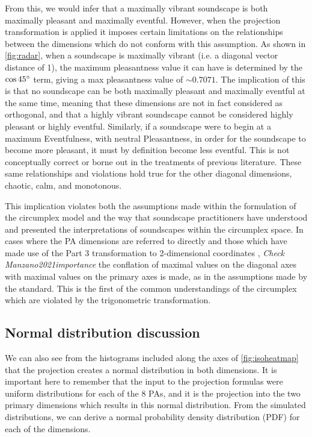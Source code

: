 From this, we would infer that a maximally vibrant soundscape is both maximally pleasant and maximally eventful. However, when the projection transformation is applied it imposes certain limitations on the relationships between the dimensions which do not conform with this assumption. As shown in \cref{fig:radar}, when a soundscape is maximally vibrant (i.e. a diagonal vector distance of 1), the maximum pleasantness value it can have is determined by the $\cos 45\degree$ term, giving a max pleasantness value of $\sim0.7071$. The implication of this is that no soundscape can be both maximally pleasant and maximally eventful at the same time, meaning that these dimensions are not in fact considered as orthogonal, and that a highly vibrant soundscape cannot be considered highly pleasant or highly eventful. Similarly, if a soundscape were to begin at a maximum Eventfulness, with neutral Pleasantness, in order for the soundscape to become more pleasant, it must by definition become less eventful. This is not conceptually correct or borne out in the treatments of previous literature. These same relationships and violations hold true for the other diagonal dimensions, chaotic, calm, and monotonous.

This implication violates both the assumptions made within the formulation of the circumplex model and the way that soundscape practitioners have understood and presented the interpretations of soundscapes within the circumplex space. In cases where the PA dimensions are referred to directly \citep{steele2016evaluation, steele2019soundtracking} and those which have made use of the Part 3 transformation to 2-dimensional coordinates \citep{Mancini2021Soundwalk, Lionello2021Introducing, Manzano2021importance}, \emph{Check Manzano2021importance} the conflation of maximal values on the diagonal axes with maximal values on the primary axes is made, as in the assumptions made by the standard. This is the first of the common understandings of the circumplex which are violated by the trigonometric transformation.

\subsection{Normal distribution discussion}

We can also see from the histograms included along the axes of \cref{fig:isoheatmap} that the projection creates a normal distribution in both dimensions. %
It is important here to remember that the input to the projection formulas were uniform distributions for each of the 8 PAs, and it is the projection into the two primary dimensions which results in this normal distribution.
From the simulated distributions, we can derive a normal probability density distribution (PDF) for each of the dimensions.

